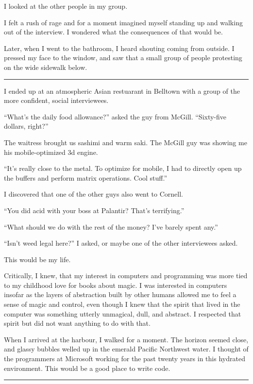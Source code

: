 I looked at the other people in my group. 

I felt a rush of rage and for a moment imagined myself standing up and walking
out of the interview.  I wondered what the consequences of that would be.  

Later, when I went to the bathroom, I heard shouting coming from outside.  I
pressed my face to the window, and saw that a small group of people protesting
on the wide sidewalk below.

\plainfancybreak{12pt}{2}{* * *}

I ended up at an atmospheric Asian restuarant in Belltown with a group of the
more confident, social interviewees. 

``What's the daily food allowance?'' asked the guy from McGill. ``Sixty-five
dollars, right?''

The waitress brought us sashimi and warm saki.  The McGill guy was showing me
his mobile-optimized 3d engine.

``It's really close to the metal.  To optimize for mobile, I had to directly
open up the buffers and perform matrix operations.  Cool stuff.''

I discovered that one of the other guys also went to Cornell.  

``You did acid with your boss at Palantir?  That's terrifying.''

``What should we do with the rest of the money?  I've barely spent any.''

``Isn't weed legal here?'' I asked, or maybe one of the other interviewees
asked.


This would be my life.

Critically, I knew, that my interest in computers and programming was more tied
to my childhood love for books about magic.  I was interested in computers
insofar as the layers of abstraction built by other humans allowed me to feel a
sense of magic and control, even though I knew that the spirit that lived in the
computer was something utterly unmagical, dull, and abstract.  I respected that
spirit but did not want anything to do with that.  


When I arrived at the harbour, I walked for a moment.  The horizon seemed close,
and glassy bubbles welled up in the emerald Pacific Northwest water.  I thought
of the programmers at Microsoft working for the past twenty years in this
hydrated environment.  This would be a good place to write code.

\plainfancybreak{12pt}{2}{* * *}


